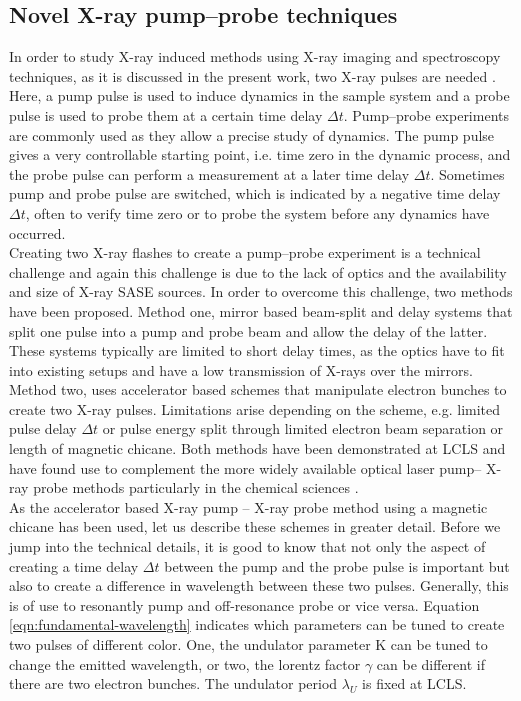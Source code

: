 \subsection{Novel X-ray pump–probe techniques}
In order to study X-ray induced methods using X-ray imaging and spectroscopy techniques, as it is discussed in the present work, two X-ray pulses are needed . Here, a pump pulse is used to induce dynamics in the sample system and a probe pulse is used to probe them at a certain time delay $\Delta t$. Pump--probe experiments are commonly used as they allow a precise study of dynamics. The pump pulse gives a very controllable starting point, i.e. time zero in the dynamic process, and the probe pulse can perform a measurement at a later time delay $\Delta t$. Sometimes pump and probe pulse are switched, which is indicated by a negative time delay $\Delta t$, often to verify time zero or to probe the system before any dynamics have occurred.\\
Creating two X-ray flashes to create a pump--probe experiment is a technical challenge and again this challenge is due to the lack of optics and the availability and size of X-ray SASE sources. In order to overcome this challenge, two methods have been proposed. Method one, mirror based beam-split and delay systems \citep{Castagna-2013-JPCS,Murphy-2012-SPIE} that split one pulse into a pump and probe beam and allow the delay of the latter. These systems typically are limited to short delay times, as the optics have to fit into existing setups and have a low transmission of X-rays over the mirrors. Method two, uses accelerator based schemes \citep{Lutman-2013-PRL,Marinelli-2015-NatComm} that manipulate electron bunches to create two X-ray pulses. Limitations arise depending on the scheme, e.g. limited pulse delay $\Delta t$ or pulse energy split through limited electron beam separation or length of magnetic chicane. Both methods have been demonstrated at LCLS and have found use to complement the more widely available optical laser pump-- X-ray probe methods particularly in the chemical sciences \cite{Picon-2016-NatComm,Ferguson-2016-SciAdv,Liekhus-Schmaltz-2015-NatComm}.\\
As the accelerator based X-ray pump -- X-ray probe method using a magnetic chicane has been used, let us describe these schemes in greater detail. Before we jump into the technical details, it is good to know that not only the aspect of creating a time delay $\Delta t$ between the pump and the probe pulse is important but also to create a difference in wavelength between these two pulses. Generally, this is of use to resonantly pump and off-resonance probe or vice versa. Equation \eqref{eqn:fundamental-wavelength} indicates which parameters can be tuned to create two pulses of different color. One, the undulator parameter K can be tuned to change the emitted wavelength, or two, the lorentz factor $\gamma$ can be different if there are two electron bunches. The undulator period $\lambda_{U}$ is fixed at LCLS.
